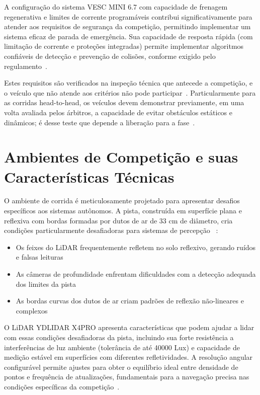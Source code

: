A configuração do sistema VESC MINI 6.7 com capacidade de frenagem regenerativa
e limites de corrente programáveis contribui significativamente para atender
aos requisitos de segurança da competição, permitindo implementar um sistema
eficaz de parada de emergência. Sua capacidade de resposta rápida (com
limitação de corrente e proteções integradas) permite implementar algoritmos
confiáveis de detecção e prevenção de colisões, conforme exigido pelo
regulamento~\cite{F1TENTHRules2023}.

Estes requisitos são verificados na inspeção técnica que antecede a competição,
e o veículo que não atende aos critérios não pode
participar~\cite{F1TENTHRules2023}. Particularmente para as corridas
head-to-head, os veículos devem demonstrar previamente, em uma volta avaliada
pelos árbitros, a capacidade de evitar obstáculos estáticos e dinâmicos; é desse
teste que depende a liberação para a fase~\cite{F1TENTHRules2023}.

\section{Ambientes de Competição e suas Características Técnicas}

O ambiente de corrida é meticulosamente projetado para apresentar desafios
específicos aos sistemas autônomos. A pista, construída em superfície plana e
reflexiva com bordas formadas por dutos de ar de 33 cm de diâmetro, cria
condições particularmente desafiadoras para sistemas de percepção
~\cite{OKelly2020F1TENTH}:

\begin{itemize}
      \item Os feixes do LiDAR frequentemente refletem no solo reflexivo, gerando ruídos e
            falsas leituras
      \item As câmeras de profundidade enfrentam dificuldades com a detecção adequada dos
            limites da pista
      \item As bordas curvas dos dutos de ar criam padrões de reflexão não-lineares e
            complexos
\end{itemize}

O LiDAR YDLIDAR X4PRO apresenta características que podem ajudar a lidar com
essas condições desafiadoras da pista, incluindo sua forte resistência a
interferências de luz ambiente (tolerância de até 40000 Lux) e capacidade de
medição estável em superfícies com diferentes refletividades. A resolução
angular configurável permite ajustes para obter o equilíbrio ideal entre
densidade de pontos e frequência de atualizações, fundamentais para a navegação
precisa nas condições específicas da competição~\cite{OKelly2020F1TENTH}.

